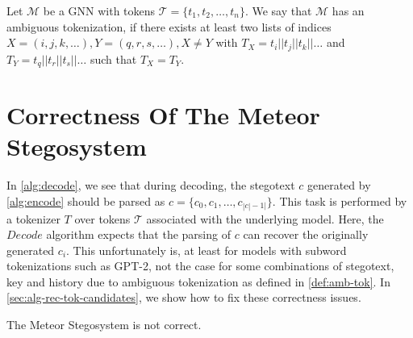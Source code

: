 \begin{definition}
	\label{def:amb-tok}
	Let $\mathcal{M}$ be a GNN with tokens $\mathcal{T} = \{ t_1, t_2, \dots, t_n \}$.
	We say that $\mathcal{M}$ has an ambiguous tokenization, if there exists at least two lists of indices $X = (i, j, k, \dots), Y = (q, r, s, \dots), X \neq Y$ with $T_X = t_i || t_j || t_k || \dots$ and $T_Y = t_q || t_r || t_s || \dots$ such that $T_X = T_Y$.
\end{definition}

\section{Correctness Of The Meteor Stegosystem}

In \autoref{alg:decode}, we see that during decoding, the stegotext $c$ generated by \autoref{alg:encode} should be parsed as $c = \{c_0,c_1, \dots, c_{|c|-1|}\}$.
This task is performed by a tokenizer $T$ over tokens $\mathcal{T}$ associated with the underlying model.
Here, the $Decode$ algorithm expects that the parsing of $c$ can recover the originally generated $c_i$.
This unfortunately is, at least for models with subword tokenizations such as GPT-2, not the case for some combinations of stegotext, key and history due to ambiguous tokenization as defined in \autoref{def:amb-tok}.
In \autoref{sec:alg-rec-tok-candidates}, we show how to fix these correctness issues.

\begin{theorem}
The Meteor Stegosystem is not correct.
\end{theorem}

